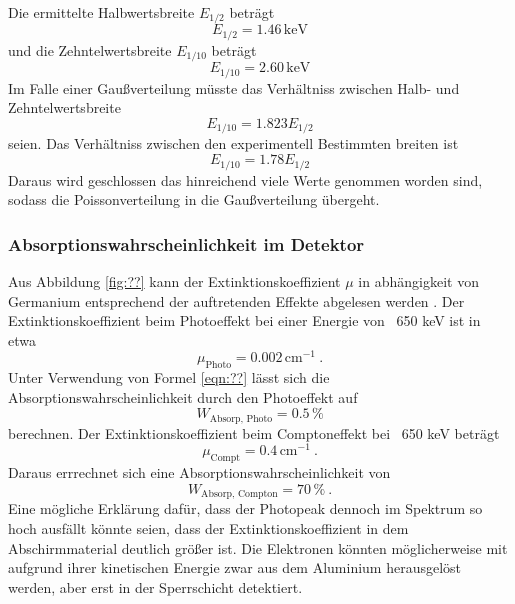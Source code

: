 Die ermittelte Halbwertsbreite $E_{1/2}$ beträgt 
\begin{equation}
  E_{1/2} = 1.46 \, \text{keV}
\end{equation}
und die Zehntelwertsbreite $E_{1/10}$ beträgt 
\begin{equation}
  E_{1/10} = 2.60 \, \text{keV}
\end{equation}
Im Falle einer Gaußverteilung müsste das Verhältniss zwischen Halb- und Zehntelwertsbreite 
\begin{equation}
  E_{1/10} = 1.823 E_{1/2}
\end{equation}
seien. Das Verhältniss zwischen den experimentell Bestimmten breiten ist
\begin{equation}
  E_{1/10} = 1.78 E_{1/2}
  \label{eqn:Ver}
\end{equation}
Daraus wird geschlossen das hinreichend viele Werte genommen worden sind, sodass die Poissonverteilung in die Gaußverteilung übergeht.

\subsubsection{Absorptionswahrscheinlichkeit im Detektor}
Aus Abbildung \ref{fig:??} kann der Extinktionskoeffizient $\mu$ in abhängigkeit von Germanium entsprechend der auftretenden Effekte abgelesen werden . Der Extinktionskoeffizient beim Photoeffekt bei einer Energie von ~650 keV ist in etwa
\begin{equation}
  \mu_\text{Photo} = 0.002 \, \text{cm} ^{-1} \ .
  \label{eqn:muPhoto}
\end{equation}
Unter Verwendung von Formel \ref{eqn:??} lässt sich die Absorptionswahrscheinlichkeit durch den Photoeffekt auf
\begin{equation}
  W_\text{Absorp, Photo} = 0.5 \, \%
  \label{eqn:AbsorpPhoto}
\end{equation}
berechnen. Der Extinktionskoeffizient beim Comptoneffekt bei ~650 keV beträgt 
\begin{equation}
  \mu_\text{Compt} = 0.4 \, \text{cm} ^{-1} \ .
  \label{eqn:muCompt}
\end{equation}
Daraus errrechnet sich eine Absorptionswahrscheinlichkeit von
\begin{equation}
  W_\text{Absorp, Compton} = 70 \, \% \ .
  \label{eqn:AbsorpComp}
\end{equation}
Eine mögliche Erklärung dafür, dass der Photopeak dennoch im Spektrum so hoch ausfällt könnte seien, dass der Extinktionskoeffizient in dem Abschirmmaterial deutlich größer ist. Die Elektronen könnten möglicherweise mit aufgrund ihrer kinetischen Energie zwar aus dem Aluminium herausgelöst werden, aber erst in der Sperrschicht detektiert. 
